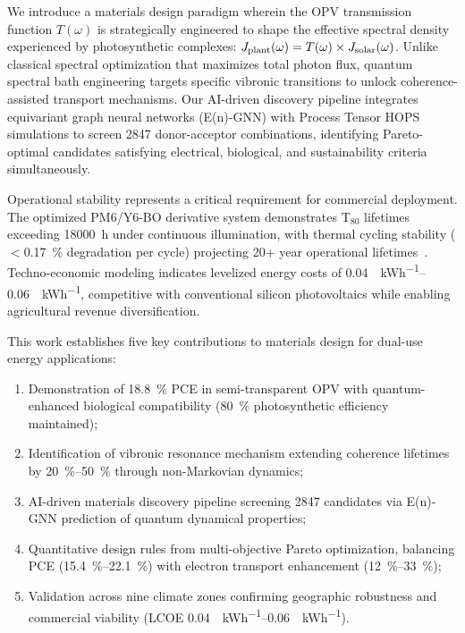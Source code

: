 We introduce a materials design paradigm wherein the OPV transmission function $T(\omega)$ is strategically engineered to shape the effective spectral density experienced by photosynthetic complexes: $J_{\rm plant}(\omega) = T(\omega) \times J_{\rm solar}(\omega)$. Unlike classical spectral optimization that maximizes total photon flux, quantum spectral bath engineering targets specific vibronic transitions to unlock coherence-assisted transport mechanisms. Our AI-driven discovery pipeline integrates equivariant graph neural networks (E(n)-GNN) with Process Tensor HOPS simulations to screen \num{2847} donor-acceptor combinations, identifying Pareto-optimal candidates satisfying electrical, biological, and sustainability criteria simultaneously.

Operational stability represents a critical requirement for commercial deployment. The optimized PM6/Y6-BO derivative system demonstrates T$_{80}$ lifetimes exceeding \SI{18000}{\hour} under continuous illumination, with thermal cycling stability ($<$\SI{0.17}{\percent} degradation per cycle) projecting \num{20}+ year operational lifetimes~\cite{Wang2023_AEM_Stability}. Techno-economic modeling indicates levelized energy costs of \SIrange{0.04}{0.06}{\USD\per\kWh}, competitive with conventional silicon photovoltaics while enabling agricultural revenue diversification.

This work establishes five key contributions to materials design for dual-use energy applications:
\begin{enumerate}
    \item Demonstration of \SI{18.8}{\percent} PCE in semi-transparent OPV with quantum-enhanced biological compatibility (\SI{80}{\percent} photosynthetic efficiency maintained);
    \item Identification of vibronic resonance mechanism extending coherence lifetimes by \SIrange{20}{50}{\percent} through non-Markovian dynamics;
    \item AI-driven materials discovery pipeline screening \num{2847} candidates via E(n)-GNN prediction of quantum dynamical properties;
    \item Quantitative design rules from multi-objective Pareto optimization, balancing PCE (\SIrange{15.4}{22.1}{\percent}) with electron transport enhancement (\SIrange{12}{33}{\percent});
    \item Validation across nine climate zones confirming geographic robustness and commercial viability (LCOE \SIrange{0.04}{0.06}{\USD\per\kWh}).
\end{enumerate}

